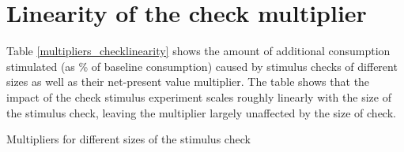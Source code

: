 \documentclass[../HAFiscal]{subfiles}
\begin{document}
\section{Linearity of the check multiplier}

Table \ref{multipliers_checklinearity} shows the amount of additional consumption stimulated (as \% of baseline consumption) caused by stimulus checks of different sizes as well as their net-present value multiplier. The table shows that the impact of the check stimulus experiment scales roughly linearly with the size of the stimulus check, leaving the multiplier largely unaffected by the size of check.

\begin{table}[h] 
	\center
	
	\caption{Multipliers for different sizes of the stimulus check}
	\label{multipliers_checklinearity}
\end{table}
\end{document}
